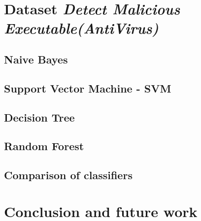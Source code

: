 \documentclass[11pt,a4paper,titlepage]{article}
\begin{document}
\section{Dataset \textit{Detect Malicious Executable(AntiVirus)}}
\subsection{Naive Bayes}
\subsection{Support Vector Machine - SVM}
\subsection{Decision Tree}
\subsection{Random Forest}
\subsection{Comparison of classifiers}

\section{Conclusion and future work}
\end{document}
